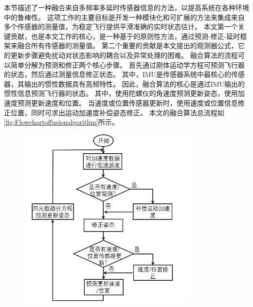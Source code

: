 \documentclass[
  type=master
]{gdutthesis}
\begin{document}
本节描述了一种融合来自多频率多延时传感器信息的方法，以提高系统在各种环境中的鲁棒性。
这项工作的主要目标是开发一种模块化和可扩展的方法来集成来自多个传感器的测量值，为稳定飞行提供平滑准确的实时状态估计。
本文第一个关键贡献，也是本文工作的核心，是一种基于\parencite{mahony2008nonlinear}的原则性方法，通过预测-修正-延时框架来融合所有传感器的测量值。
第二个重要的贡献是本文提出的观测器公式，它的更新步骤避免扰动对状态影响的耦合以及异常处理的困难。
融合算法的流程可以简单分解为预测和修正两个核心步骤。
首先通过刚体运动学方程可预测飞行器的状态，然后通过测量信息修正状态。
其中，IMU是传感器系统中最核心的传感器，其输出的惯性数据具有高频特性。
因此，融合算法的核心是通过IMU输出的惯性信息预测飞行器的状态。
其中，使用陀螺仪的角速度预测更新姿态，使用加速度预测更新速度和位置。
当速度或位置传感器更新时，使用速度或位置信息修正位置，同时可求出运动加速度补偿姿态修正。
本文的融合算法总流程如\autoref{fig:Flowchartoffusionalgorithm}所示。
\begin{figure}[H]
	\centering
	\includegraphics[width=0.8\textwidth]{屏幕截图 2022-03-06 210135.png}
	\label{fig:Flowchartoffusionalgorithm}
\end{figure}
\end{document}
